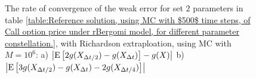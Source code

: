 \documentclass[11pt]{article}
\newcommand{\expt}[1]{\mathrm{E}\left[#1\right]}
\begin{document}
\begin{figure}[h!]
	\caption{The rate of convergence of the weak error for set $2$ parameters in table \ref{table:Reference solution, using MC with $500$ time steps, of Call option price under rBergomi model, for different parameter constellation.}, with Richardson extraploation, using MC with $M=10^6$: a) $\abs{\expt{2 g(X_{\Delta t/2}) -g(X_{\Delta t})}-g(X)}$  b) $\abs{\expt{3 g(X_{\Delta t/2})-g(X_{\Delta t})-2 g(X_{\Delta t/4})}}$ }
	\label{fig:Weak_rate_H_007_with_rich}
\end{figure}

%	
%
%
%
%
%
%	
%
%
%
\end{document}
